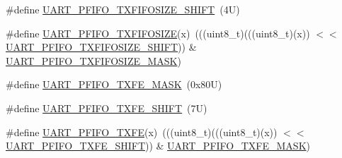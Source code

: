 \begin{DoxyCompactItemize}
\item 
\#define \mbox{\hyperlink{group___u_a_r_t___register___masks_gaa0377f9b585a07f11f887a7d2c8133c8}{U\+A\+R\+T\+\_\+\+P\+F\+I\+F\+O\+\_\+\+T\+X\+F\+I\+F\+O\+S\+I\+Z\+E\+\_\+\+S\+H\+I\+FT}}~(4\+U)
\item 
\#define \mbox{\hyperlink{group___u_a_r_t___register___masks_ga4c13afc31f45e633d2dc02707b332d11}{U\+A\+R\+T\+\_\+\+P\+F\+I\+F\+O\+\_\+\+T\+X\+F\+I\+F\+O\+S\+I\+ZE}}(x)~(((uint8\+\_\+t)(((uint8\+\_\+t)(x)) $<$$<$ \mbox{\hyperlink{group___u_a_r_t___register___masks_gaa0377f9b585a07f11f887a7d2c8133c8}{U\+A\+R\+T\+\_\+\+P\+F\+I\+F\+O\+\_\+\+T\+X\+F\+I\+F\+O\+S\+I\+Z\+E\+\_\+\+S\+H\+I\+FT}})) \& \mbox{\hyperlink{group___u_a_r_t___register___masks_ga61eb610888ac018061d20a755264292a}{U\+A\+R\+T\+\_\+\+P\+F\+I\+F\+O\+\_\+\+T\+X\+F\+I\+F\+O\+S\+I\+Z\+E\+\_\+\+M\+A\+SK}})
\item 
\#define \mbox{\hyperlink{group___u_a_r_t___register___masks_gabd2ffab4f7a98fcfc64dcd37db1b289b}{U\+A\+R\+T\+\_\+\+P\+F\+I\+F\+O\+\_\+\+T\+X\+F\+E\+\_\+\+M\+A\+SK}}~(0x80\+U)
\item 
\#define \mbox{\hyperlink{group___u_a_r_t___register___masks_gaf418bafa3c46ece2f82d0c831e8aea47}{U\+A\+R\+T\+\_\+\+P\+F\+I\+F\+O\+\_\+\+T\+X\+F\+E\+\_\+\+S\+H\+I\+FT}}~(7\+U)
\item 
\#define \mbox{\hyperlink{group___u_a_r_t___register___masks_ga229ce94532ef3923587d6e9c50434e42}{U\+A\+R\+T\+\_\+\+P\+F\+I\+F\+O\+\_\+\+T\+X\+FE}}(x)~(((uint8\+\_\+t)(((uint8\+\_\+t)(x)) $<$$<$ \mbox{\hyperlink{group___u_a_r_t___register___masks_gaf418bafa3c46ece2f82d0c831e8aea47}{U\+A\+R\+T\+\_\+\+P\+F\+I\+F\+O\+\_\+\+T\+X\+F\+E\+\_\+\+S\+H\+I\+FT}})) \& \mbox{\hyperlink{group___u_a_r_t___register___masks_gabd2ffab4f7a98fcfc64dcd37db1b289b}{U\+A\+R\+T\+\_\+\+P\+F\+I\+F\+O\+\_\+\+T\+X\+F\+E\+\_\+\+M\+A\+SK}})
\end{DoxyCompactItemize}
